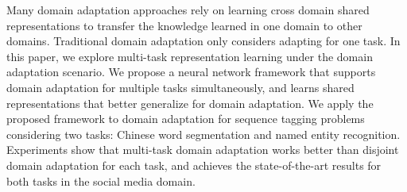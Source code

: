 Many domain adaptation approaches rely on learning cross domain shared representations to transfer the knowledge learned in one domain to other domains. Traditional domain adaptation only considers adapting for one task. In this paper, we explore multi-task representation learning under the domain adaptation scenario. We propose a neural network framework that supports domain adaptation for multiple tasks simultaneously, and learns shared representations that better generalize for domain adaptation. We apply the proposed framework to domain adaptation for sequence tagging problems considering two tasks: Chinese word segmentation and named entity recognition. Experiments show that multi-task domain adaptation works better than disjoint domain adaptation for each task, and achieves the state-of-the-art results for both tasks in the social media domain.

